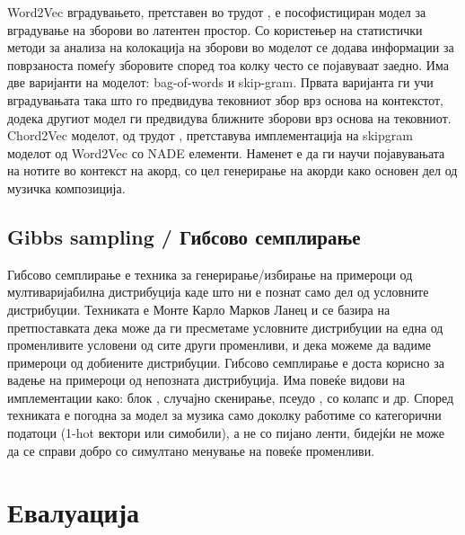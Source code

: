 Word2Vec вградувањето, претставен во трудот \cite{Mikolov2013}, е пософистициран модел за вградување на зборови во латентен простор. Со користењер на статистички методи за анализа на колокација на зборови во моделот се додава информации за поврзаноста помеѓу зборовите според тоа колку често се појавуваат заедно. Има две варијанти на моделот: bag-of-words и skip-gram. Првата варијанта ги учи вградувањата така што го предвидува тековниот збор врз основа на контекстот, додека другиот модел ги предвидува ближните зборови врз основа на тековниот. 
Chord2Vec моделот, од трудот \cite{Madjiheurem2016}, претставува имплементација на skipgram моделот од Word2Vec со NADE елементи. Наменет е да ги научи појавувањата на нотите во контекст на акорд, со цел генерирање на акорди како основен дел од музичка композиција. 

\section{Gibbs sampling / Гибсово семплирање}

Гибсово семплирање е техника за генерирање/избирање на примероци од мултиваријабилна дистрибуција каде што ни е познат само дел од условните дистрибуции. Техниката е Монте Карло Марков Ланец и се базира на претпоставката дека може да ги пресметаме условните дистрибуции на една од променливите условени од сите други променливи, и дека можеме да вадиме примероци од добиените дистрибуции. Гибсово семплирање е доста корисно за вадење на примероци од непозната дистрибуција. Има повеќе видови на имплементации како: блок \cite{Boulanger-Lewandowski2012, Goel2014}, случајно скенирање, псеудо \cite{Hadjeres2016}, со колапс и др. Според \cite{Hadjeres2016} техниката е погодна за модел за музика само доколку работиме со категорични податоци (1-hot вектори или симобили), а не со пијано ленти, бидејќи не може да се справи добро со симултано менување на повеќе променливи.

\chapter{Евалуација}
\label{ch:evaluacija}

